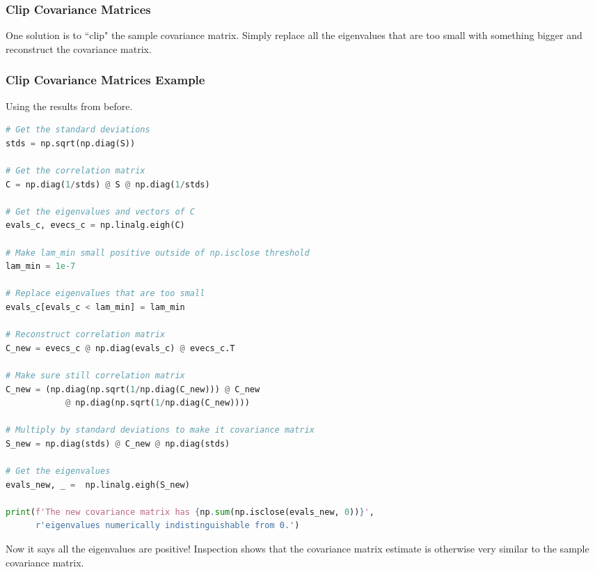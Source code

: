 \documentclass{beamer}
\begin{document}
\begin{frame}
\frametitle{Clip Covariance Matrices}

One solution is to ``clip" the sample covariance matrix. Simply replace all the eigenvalues that are too small with something bigger and reconstruct the covariance matrix.

\end{frame}

\begin{frame}[fragile]
\frametitle{Clip Covariance Matrices Example}
\small
Using the results from before. 
\begin{multicols}{2}
\begin{lstlisting}[language=Python]
# Get the standard deviations
stds = np.sqrt(np.diag(S))

# Get the correlation matrix
C = np.diag(1/stds) @ S @ np.diag(1/stds)

# Get the eigenvalues and vectors of C
evals_c, evecs_c = np.linalg.eigh(C)

# Make lam_min small positive outside of np.isclose threshold
lam_min = 1e-7

# Replace eigenvalues that are too small
evals_c[evals_c < lam_min] = lam_min

# Reconstruct correlation matrix
C_new = evecs_c @ np.diag(evals_c) @ evecs_c.T

# Make sure still correlation matrix
C_new = (np.diag(np.sqrt(1/np.diag(C_new))) @ C_new
            @ np.diag(np.sqrt(1/np.diag(C_new))))

# Multiply by standard deviations to make it covariance matrix
S_new = np.diag(stds) @ C_new @ np.diag(stds)

# Get the eigenvalues
evals_new, _ =  np.linalg.eigh(S_new)

print(f'The new covariance matrix has {np.sum(np.isclose(evals_new, 0))}',
      r'eigenvalues numerically indistinguishable from 0.')
\end{lstlisting}
\end{multicols}
Now it says all the eigenvalues are positive! Inspection shows that the covariance matrix estimate is otherwise very similar to the sample covariance matrix.
\end{frame}
\end{document}
